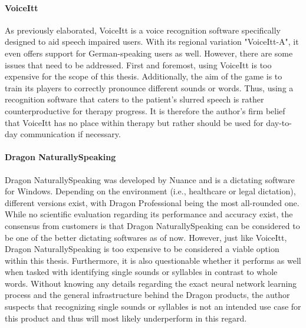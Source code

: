 \documentclass[draft,final]{vutinfth} %
\begin{document}
\paragraph{VoiceItt} As previously elaborated, VoiceItt is a voice recognition software specifically designed to aid speech impaired users. With its regional variation "VoiceItt-A", it even offers support for German-speaking users as well. However, there are some issues that need to be addressed. First and foremost, using VoiceItt is too expensive for the scope of this thesis. Additionally, the aim of the game is to train its players to correctly pronounce different sounds or words. Thus, using a recognition software that caters to the patient's slurred speech is rather counterproductive for therapy progress. It is therefore the author's firm belief that VoiceItt has no place within therapy but rather should be used for day-to-day communication if necessary.

\paragraph{Dragon NaturallySpeaking} Dragon NaturallySpeaking was developed by Nuance and is a dictating software for Windows. Depending on the environment (i.e., healthcare or legal dictation), different versions exist, with Dragon Professional being the most all-rounded one. While no scientific evaluation regarding its performance and accuracy exist, the consensus from customers is that Dragon NaturallySpeaking can be considered to be one of the better dictating softwares as of now. However, just like VoiceItt, Dragon NaturallySpeaking is too expensive to be considered a viable option within this thesis. Furthermore, it is also questionable whether it performs as well when tasked with identifying single sounds or syllables in contrast to whole words. Without knowing any details regarding the exact neural network learning process and the general infrastructure behind the Dragon products, the author suspects that recognizing single sounds or syllables is not an intended use case for this product and thus will most likely underperform in this regard. 
\end{document}
